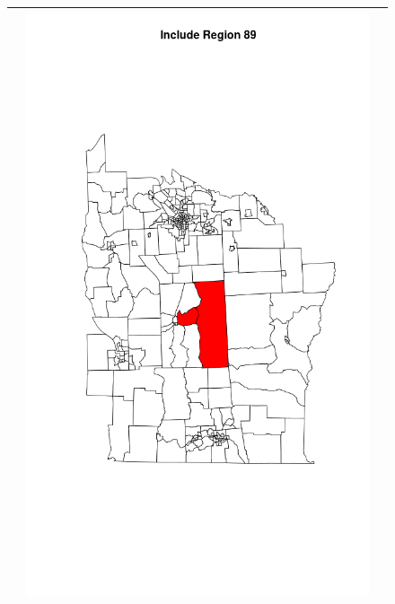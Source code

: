 \documentclass[12pt]{article}
\begin{document}
\begin{figure}[!ht]
\begin{tabular}{|c|c|c|}
					&\includegraphics[scale=0.18]{ny89.png} \\ \hline

\end{tabular}
\end{figure}
\end{document}
